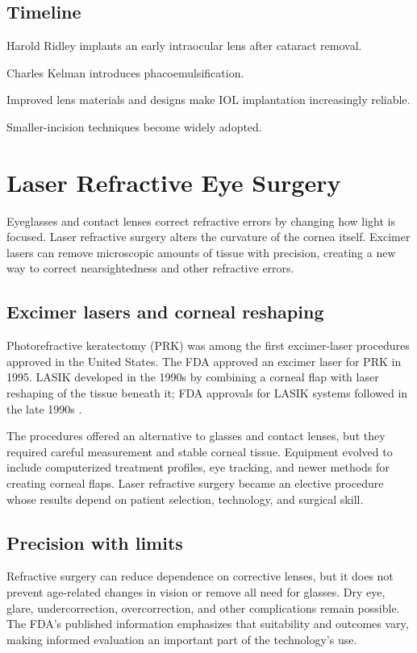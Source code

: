 \documentclass[12pt,oneside]{book}
\begin{document}
\section*{Timeline}
\begin{description}[leftmargin=2.3cm,style=nextline]
  \item[1949] Harold Ridley implants an early intraocular lens after cataract removal.
  \item[1967] Charles Kelman introduces phacoemulsification.
  \item[1970s--1980s] Improved lens materials and designs make IOL implantation increasingly reliable.
  \item[Late twentieth century] Smaller-incision techniques become widely adopted.
\end{description}
\chapter[Laser Refractive Eye Surgery]{Laser Refractive Eye Surgery}

Eyeglasses and contact lenses correct refractive errors by changing how light
is focused. Laser refractive surgery alters the curvature of the cornea
itself. Excimer lasers can remove microscopic amounts of tissue with
precision, creating a new way to correct nearsightedness and other refractive
errors.

\section{Excimer lasers and corneal reshaping}
Photorefractive keratectomy (PRK) was among the first excimer-laser procedures approved in the United States. The FDA approved an excimer laser for PRK in 1995. LASIK developed in the 1990s by combining a corneal flap with laser reshaping of the tissue beneath it; FDA approvals for LASIK systems followed in the late 1990s \cite{fdaRefractiveLasers,fdaLasikLasers}.

The procedures offered an alternative to glasses and contact lenses, but they
required careful measurement and stable corneal tissue. Equipment evolved to
include computerized treatment profiles, eye tracking, and newer methods for
creating corneal flaps. Laser refractive surgery became an elective procedure
whose results depend on patient selection, technology, and surgical skill.

\section{Precision with limits}
Refractive surgery can reduce dependence on corrective lenses, but it does not prevent age-related changes in vision or remove all need for glasses. Dry eye, glare, undercorrection, overcorrection, and other complications remain possible. The FDA's published information emphasizes that suitability and outcomes vary, making informed evaluation an important part of the technology's use.
\end{document}
